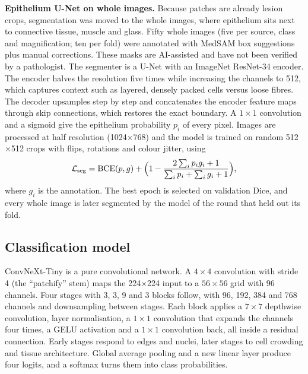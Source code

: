 \documentclass[10pt,twocolumn]{article}
\begin{document}
\textbf{Epithelium U-Net on whole images.} Because patches are already lesion crops, segmentation was moved to the whole images, where epithelium sits next to connective tissue, muscle and glass. Fifty whole images (five per source, class and magnification; ten per fold) were annotated with MedSAM box suggestions plus manual corrections. These masks are AI-assisted and have not been verified by a pathologist. The segmenter is a U-Net \citep{azad2024} with an ImageNet ResNet-34 encoder. The encoder halves the resolution five times while increasing the channels to 512, which captures context such as layered, densely packed cells versus loose fibres. The decoder upsamples step by step and concatenates the encoder feature maps through skip connections, which restores the exact boundary. A $1\times1$ convolution and a sigmoid give the epithelium probability $p_i$ of every pixel. Images are processed at half resolution (1024$\times$768) and the model is trained on random 512$\times$512 crops with flips, rotations and colour jitter, using
\begin{equation}
\mathcal{L}_{\text{seg}} = \text{BCE}(p, g) + \Bigl(1 - \frac{2\sum_i p_i g_i + 1}{\sum_i p_i + \sum_i g_i + 1}\Bigr),
\end{equation}
where $g_i$ is the annotation. The best epoch is selected on validation Dice, and every whole image is later segmented by the model of the round that held out its fold.

\subsection{Classification model}

ConvNeXt-Tiny \citep{liu2022} is a pure convolutional network. A $4\times4$ convolution with stride 4 (the ``patchify'' stem) maps the 224$\times$224 input to a $56\times56$ grid with 96 channels. Four stages with 3, 3, 9 and 3 blocks follow, with 96, 192, 384 and 768 channels and downsampling between stages. Each block applies a $7\times7$ depthwise convolution, layer normalisation, a $1\times1$ convolution that expands the channels four times, a GELU activation and a $1\times1$ convolution back, all inside a residual connection. Early stages respond to edges and nuclei, later stages to cell crowding and tissue architecture. Global average pooling and a new linear layer produce four logits, and a softmax turns them into class probabilities.
\end{document}
